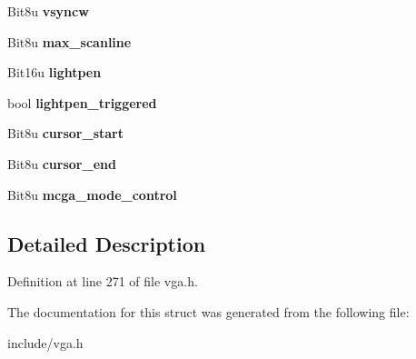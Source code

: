 \begin{DoxyCompactItemize}
\item 
\hypertarget{structVGA__OTHER_a6214860b81fc58e6a2b6712438cfdf87}{Bit8u {\bfseries vsyncw}}\label{structVGA__OTHER_a6214860b81fc58e6a2b6712438cfdf87}

\item 
\hypertarget{structVGA__OTHER_a5cda2fe9d1bbdb240fed75fbd4ebd54c}{Bit8u {\bfseries max\-\_\-scanline}}\label{structVGA__OTHER_a5cda2fe9d1bbdb240fed75fbd4ebd54c}

\item 
\hypertarget{structVGA__OTHER_aad2e4a57fdf43dd565398a1133880fe7}{Bit16u {\bfseries lightpen}}\label{structVGA__OTHER_aad2e4a57fdf43dd565398a1133880fe7}

\item 
\hypertarget{structVGA__OTHER_afdc8e6fe00dceb5d216a683d60e5c60d}{bool {\bfseries lightpen\-\_\-triggered}}\label{structVGA__OTHER_afdc8e6fe00dceb5d216a683d60e5c60d}

\item 
\hypertarget{structVGA__OTHER_ac1e5b1a383040b106970a2e96ffe7ba9}{Bit8u {\bfseries cursor\-\_\-start}}\label{structVGA__OTHER_ac1e5b1a383040b106970a2e96ffe7ba9}

\item 
\hypertarget{structVGA__OTHER_a15dd5380b25f09d7bd0e6eb8b8380cbe}{Bit8u {\bfseries cursor\-\_\-end}}\label{structVGA__OTHER_a15dd5380b25f09d7bd0e6eb8b8380cbe}

\item 
\hypertarget{structVGA__OTHER_aea3fa8ca72c5f2ffa8f3f5e40b110e27}{Bit8u {\bfseries mcga\-\_\-mode\-\_\-control}}\label{structVGA__OTHER_aea3fa8ca72c5f2ffa8f3f5e40b110e27}

\end{DoxyCompactItemize}


\subsection{Detailed Description}


Definition at line 271 of file vga.\-h.



The documentation for this struct was generated from the following file\-:\begin{DoxyCompactItemize}
\item 
include/vga.\-h\end{DoxyCompactItemize}
